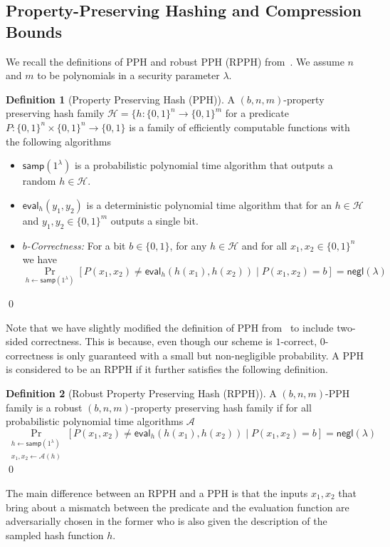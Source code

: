 \documentclass[pdflatex,sn-mathphys-num]{sn-jnl}
\theoremstyle{definition}
\newtheorem{definition}{Definition}
\begin{document}
\subsection{Property-Preserving Hashing and Compression Bounds}
\label{sub:pph-ham-compress}
We recall the definitions of PPH and robust PPH (RPPH) from~\cite{holmgren2022nearly, boyle2018adversarially}. We assume $n$ and $m$ to be polynomials in a security parameter $\lambda$. 
\begin{definition}[Property Preserving Hash (PPH)]
\label{def:pph}
A $(b, n, m)$-property preserving hash family $\mathcal{H} = \{ h : \{0, 1\}^n \rightarrow \{0, 1\}^m$ for a predicate $P : \{0, 1\}^n \times \{0, 1\}^n \rightarrow \{0, 1\}$ is a family of efficiently computable functions with the following algorithms
\begin{itemize}
    \item $\mathsf{samp}(1^\lambda)$ is a probabilistic polynomial time algorithm that outputs a random $h \in \mathcal{H}$.
    \item $\mathsf{eval}_h(y_1, y_2)$ is a deterministic polynomial time algorithm that for an $h \in \mathcal{H}$ and $y_1, y_2 \in \{0, 1\}^m$ outputs a single bit.
    \item \emph{$b$-Correctness:} For a bit $b \in \{0, 1\}$, for any $h \in \mathcal{H}$ and for all $x_1, x_2 \in \{0, 1\}^n$ we have
\[
\Pr_{h \leftarrow \mathsf{samp}(1^\lambda)} \left[ P(x_1, x_2) \neq \mathsf{eval}_h(h(x_1), h(x_2)) \mid P(x_1, x_2) = b \right] = \mathsf{negl}(\lambda)
\]
\end{itemize}  \qed  
\end{definition}
Note that we have slightly modified the definition of PPH from~\cite{holmgren2022nearly, boyle2018adversarially} to include two-sided correctness. This is because, even though our scheme is $1$-correct, $0$-correctness is only guaranteed with a small but non-negligible probability.  
A PPH is considered to be an RPPH if it further satisfies the following definition.
\begin{definition}[Robust Property Preserving Hash (RPPH)]
\label{def:rpph}
A $(b, n, m)$-PPH family is a robust $(b, n, m)$-property preserving hash family if for all probabilistic polynomial time algorithms $\mathcal{A}$
\[
\Pr_{\substack{h \leftarrow \mathsf{samp}(1^\lambda)\\x_1, x_2 \leftarrow \mathcal{A}(h)}} \left[ P(x_1, x_2) \neq \mathsf{eval}_h(h(x_1), h(x_2)) \mid P(x_1, x_2) = b \right] = \mathsf{negl}(\lambda)
\] \qed
\end{definition}
The main difference between an RPPH and a PPH is that the inputs $x_1, x_2$ that bring about a mismatch between the predicate and the evaluation function are adversarially chosen in the former who is also given the description of the sampled hash function $h$. 
\end{document}
